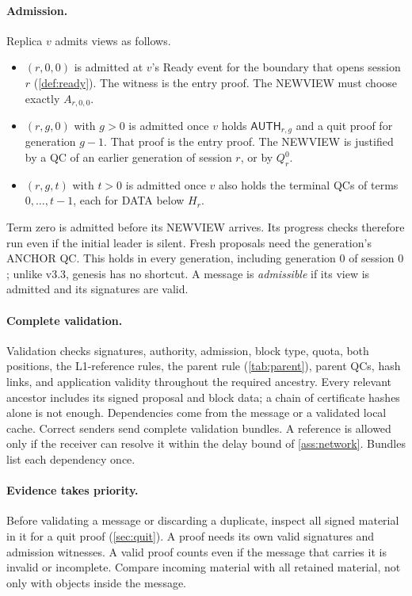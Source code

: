 \documentclass[11pt,a4paper]{article}
\newcommand{\tagg}[1]{\ensuremath{\mathsf{#1}}}
\begin{document}
\paragraph{Admission.}
Replica $v$ admits views as follows.
\begin{itemize}
\item $(r,0,0)$ is admitted at $v$'s Ready event for the boundary that
opens session $r$ (\cref{def:ready}). The witness is the entry proof.
The NEWVIEW must choose exactly $A_{r,0,0}$.
\item $(r,g,0)$ with $g>0$ is admitted once $v$ holds
$\tagg{AUTH}_{r,g}$ and a quit proof for generation $g-1$. That proof is
the entry proof. The NEWVIEW is justified by a QC of an earlier
generation of session $r$, or by $Q_r^0$.
\item $(r,g,t)$ with $t>0$ is admitted once $v$ also holds the terminal
QCs of terms $0,\ldots,t-1$, each for DATA below $H_r$.
\end{itemize}
Term zero is admitted before its NEWVIEW arrives. Its progress checks
therefore run even if the initial leader is silent. Fresh proposals need
the generation's ANCHOR QC. This holds in every generation, including
generation $0$ of session $0$; unlike v3.3, genesis has no shortcut. A
message is \emph{admissible} if its view is admitted and its signatures
are valid.

\paragraph{Complete validation.}
Validation checks signatures, authority, admission, block type, quota,
both positions, the L1-reference rules, the parent rule
(\cref{tab:parent}), parent QCs, hash links, and application validity
throughout the required ancestry. Every relevant ancestor includes its
signed proposal and block data; a chain of certificate hashes alone is
not enough. Dependencies come from the message or a validated local
cache. Correct senders send complete validation bundles. A reference is
allowed only if the receiver can resolve it within the delay bound of
\cref{ass:network}. Bundles list each dependency once.

\paragraph{Evidence takes priority.}
Before validating a message or discarding a duplicate, inspect all signed
material in it for a quit proof (\cref{sec:quit}). A proof needs its own
valid signatures and admission witnesses. A valid proof counts even if
the message that carries it is invalid or incomplete. Compare incoming
material with all retained material, not only with objects inside the
message.
\end{document}
